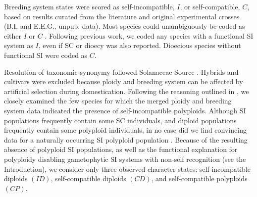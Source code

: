Breeding system states were scored as self-incompatible, $I$, or self-compatible, $C$, based on results curated from the literature  \citep[as compiled in][]{igic_2006, goldberg_2010, robertson_2011, goldberg_2012} and original experimental crosses (B.I. and E.E.G., unpub. data). %
Most species could unambiguously be coded as either $I$ or $C$ \citep{raduski_2012}.
Following previous work, we coded any species with a functional SI system as $I$, even if SC or dioecy was also reported.
Dioecious species without functional SI were coded as $C$.

Resolution of taxonomic synonymy followed Solanaceae Source \citep{solsource}. 
Hybrids and cultivars were excluded because ploidy and breeding system can be affected by artificial selection during domestication.
Following the reasoning outlined in \citet{robertson_2011}, we closely examined the few species for which the merged ploidy and breeding system data indicated the presence of self-incompatible polyploids.
Although SI populations frequently contain some SC individuals, and diploid populations frequently contain some polyploid individuals, in no case did we find convincing data for a naturally occurring SI polyploid population  \citep[discussed in][]{robertson_2011}.
Because of the resulting absence of polyploid SI populations, as well as the functional explanation for polyploidy disabling gametophytic SI systems with non-self recognition (see the Introduction), we consider only three observed character states: self-incompatible diploids $(ID)$, self-compatible diploids $(CD)$, and self-compatible polyploids $(CP)$.

